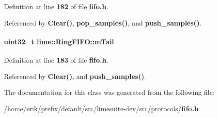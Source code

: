 Definition at line {\bf 182} of file {\bf fifo.\+h}.



Referenced by {\bf Clear()}, {\bf pop\+\_\+samples()}, and {\bf push\+\_\+samples()}.

\paragraph[{m\+Tail}]{\setlength{\rightskip}{0pt plus 5cm}uint32\+\_\+t lime\+::\+Ring\+F\+I\+F\+O\+::m\+Tail\hspace{0.3cm}{\ttfamily [protected]}}\label{classlime_1_1RingFIFO_a6b05435dbd1b5b466eea5859a3e7166c}


Definition at line {\bf 183} of file {\bf fifo.\+h}.



Referenced by {\bf Clear()}, and {\bf push\+\_\+samples()}.



The documentation for this class was generated from the following file\+:\begin{DoxyCompactItemize}
\item 
/home/erik/prefix/default/src/limesuite-\/dev/src/protocols/{\bf fifo.\+h}\end{DoxyCompactItemize}
